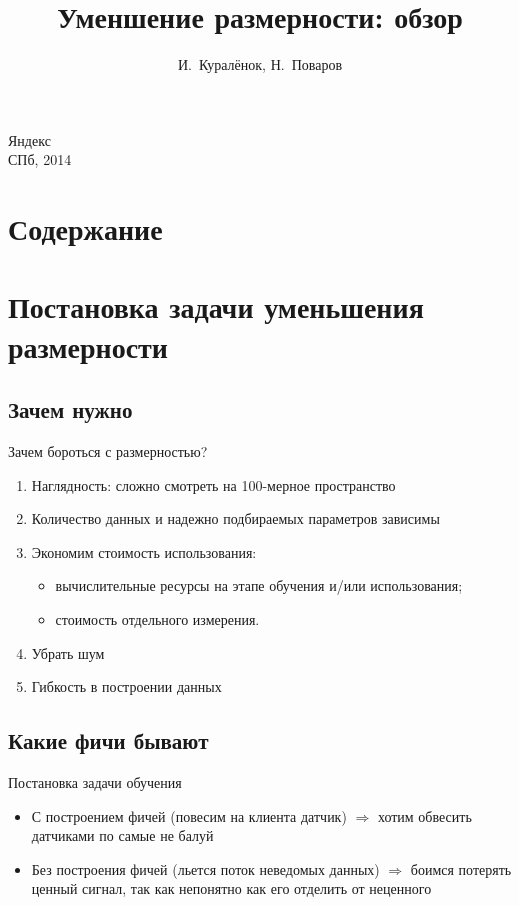 \documentclass[14pt, fleqn, xcolor={dvipsnames, table}]{beamer}
\title{Уменшение размерности: обзор\\\small{}}
\author[]{\small{%
И.~Куралёнок,
Н.~Поваров}}
\date{}
\begin{document}
\begin{frame}
\maketitle
\small
\begin{center}
\vspace{-60pt}
\normalsize {\color{red}Я}ндекс \\
\vspace{80pt}
\footnotesize СПб, 2014
\end{center}
\end{frame}

\section{Содержание}
\section{Постановка задачи уменьшения размерности}
\subsection{Зачем нужно}
\begin{frame}{Зачем бороться с размерностью?}
\begin{enumerate}
  \item Наглядность: сложно смотреть на 100-мерное пространство
  \item Количество данных и надежно подбираемых параметров зависимы
  \item Экономим стоимость использования:
  \begin{itemize}
    \item вычислительные ресурсы на этапе обучения и/или использования;
    \item стоимость отдельного измерения.
  \end{itemize}
  \item Убрать шум
  \item Гибкость в построении данных
\end{enumerate}
\end{frame}

\subsection{Какие фичи бывают}
\begin{frame}{Постановка задачи обучения}
\begin{itemize}
  \item С построением фичей (повесим на клиента датчик) $\Rightarrow$ хотим обвесить датчиками по самые не балуй
  \item Без построения фичей (льется поток неведомых данных) $\Rightarrow$ боимся потерять ценный сигнал, так как непонятно как его отделить от неценного
\end{itemize}
\end{frame}
\end{document}
